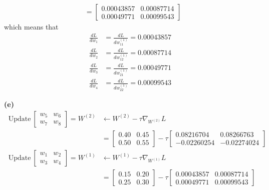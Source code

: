 \documentclass[a4paper, 12pt]{article}
\begin{document}
\begin{solution}
\begin{align*}
    &= \begin{bmatrix}
        0.00043857 & 0.00087714 \\
        0.00049771 & 0.00099543
    \end{bmatrix}
    \end{align*}
    which means that \begin{align*}
        \frac{dL}{dw_1} &= \frac{dL}{dw^{(1)}_{11}} = 0.00043857 \\
        \frac{dL}{dw_2} &= \frac{dL}{dw^{(1)}_{12}} = 0.00087714\\
        \frac{dL}{dw_3} &= \frac{dL}{dw^{(1)}_{21}} = 0.00049771 \\
        \frac{dL}{dw_4} &= \frac{dL}{dw^{(1)}_{22}} = 0.00099543
    \end{align*}

    \textbf{(e)}
    \begin{align*}
    \:\text{Update}\: \begin{bmatrix}
    w_5 & w_6 \\
    w_7 & w_8
    \end{bmatrix} = W^{(2)} &\leftarrow W^{(2)} - \tau \nabla_{W^{(2)}}L \\
    &= \begin{bmatrix}
        0.40 & 0.45 \\
        0.50 & 0.55
        \end{bmatrix} - \tau \begin{bmatrix}
            0.08216704 &  0.08266763 \\
        -0.02260254  & -0.02274024
        \end{bmatrix} \\
    \:\text{Update}\: \begin{bmatrix}
        w_1 & w_2 \\
        w_3 & w_4
        \end{bmatrix} = W^{(1)} &\leftarrow W^{(1)} - \tau \nabla_{W^{(1)}}L \\
        &= \begin{bmatrix}
            0.15 & 0.20 \\
            0.25 & 0.30
            \end{bmatrix} - \tau \begin{bmatrix}
                0.00043857 & 0.00087714 \\
                0.00049771 & 0.00099543
            \end{bmatrix}
    \end{align*}
\end{solution}
\end{document}
